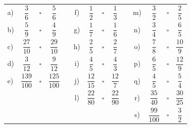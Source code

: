 \documentclass[10 pt,usenames,dvipsnames, oneside]{article}
\begin{document}
\begin{center}
\begin{longtable}{lccccccccccccc}
 a)  &  $\dfrac{3}{6}$     &{\huge $\square$}  &  $\dfrac{5}{6}$   & \parbox[t][.6cm]{2cm}{ } \quad \quad\quad  & f)  &  $\dfrac{1}{2}$     & {\huge $\square$} &  $\dfrac{1}{3}$    & \quad \quad\quad  & m)  &  $\dfrac{3}{2}$     & {\huge $\square$} &  $\dfrac{2}{5}$    \\
 b)  &  $\dfrac{5}{9}$     &{\huge $\square$}&  $\dfrac{4}{9}$   & \parbox[t][.6cm]{2cm}{ }    & g)  &  $\dfrac{1}{7}$     &{\huge $\square$} &  $\dfrac{1}{6}$    &   & n)  &  $\dfrac{3}{4}$     &{\huge $\square$} &  $\dfrac{6}{5}$    \\
 c)  &  $\dfrac{27}{10}$    &{\huge $\square$} &  $\dfrac{29}{10}$   & \parbox[t][.6cm]{2cm}{ }   & h)  &  $\dfrac{2}{5}$     &{\huge $\square$}&  $\dfrac{2}{7}$    &   & o)  &  $\dfrac{7}{8}$     &{\huge $\square$} &  $\dfrac{10}{9}$   \\
 d)  &  $\dfrac{3}{12}$    &{\huge $\square$}&  $\dfrac{9}{12}$   & \parbox[t][.6cm]{2cm}{ }   & i)  &  $\dfrac{4}{5}$     &{\huge $\square$}&  $\dfrac{4}{3}$    &   & p)  &  $\dfrac{6}{5}$     &{\huge $\square$}&  $\dfrac{12}{9}$   \\
 e)  &  $\dfrac{139}{100}$  &{\huge $\square$}&  $\dfrac{125}{100}$ & \parbox[t][.6cm]{2cm}{ }   & j)  &  $\dfrac{12}{15}$   &{\huge $\square$}&  $\dfrac{12}{7}$   &   & q)  &  $\dfrac{4}{5}$     &{\huge $\square$}&  $\dfrac{5}{4}$    \\
     &&                     &    &                  \parbox[t][.6cm]{2cm}{ }    &  l)  &  $\dfrac{22}{80}$   &{\huge $\square$}&  $\dfrac{22}{90}$  &   & r)  &  $\dfrac{35}{40}$   &{\huge $\square$}&  $\dfrac{30}{25}$  \\
     &&                      &    &                    &      &  \parbox[t][.6cm]{2cm}{ }                    &   &                   &   &  s)  &  $\dfrac{99}{100}$  &{\huge $\square$}&  $\dfrac{3}{2}$    \\
\end{longtable}
 \end{center}
\end{document}
